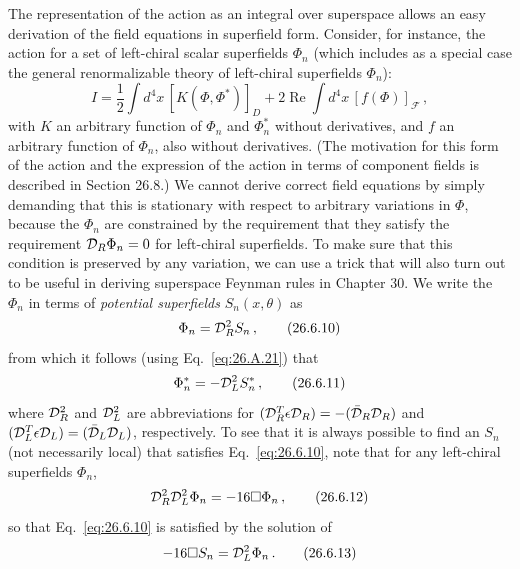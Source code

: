The representation of the action as an integral over superspace allows an
easy derivation of the field equations in superfield form. Consider, for
instance, the action for a set of left-chiral scalar superfields \(\Phi_n\)
(which includes as a special case the general renormalizable theory of
left-chiral superfields \(\Phi_n\)):
\begin{equation}
  I
  =\frac12\int d^4x\,[K(\Phi,\Phi^*)]_D
   +2\operatorname{Re}\int d^4x\,[f(\Phi)]_{\mathcal{F}}\,,
  \tag{26.6.9}\label{eq:26.6.9}
\end{equation}
with \(K\) an arbitrary function of \(\Phi_n\) and \(\Phi_n^*\) without
derivatives, and \(f\) an arbitrary function of \(\Phi_n\), also without
derivatives. (The motivation for this form of the action and the expression of
the action in terms of component fields is described in Section 26.8.) We
cannot derive correct field equations by simply demanding that this is
stationary with respect to arbitrary variations in \(\Phi\), because the
\(\Phi_n\) are constrained by the requirement that they satisfy the
requirement \(\mathcal{D}_R\Phi_n=0\) for left-chiral superfields. To make sure
that this condition is preserved by any variation, we can use a trick that
will also turn out to be useful in deriving superspace Feynman rules in
Chapter 30. We write the \(\Phi_n\) in terms of \emph{potential superfields}
\(S_n(x,\theta)\) as
\begin{equation}
  \Phi_n=\mathcal{D}_R^2S_n\,,
  \tag{26.6.10}\label{eq:26.6.10}
\end{equation}
from which it follows (using Eq.~\eqref{eq:26.A.21}) that
\begin{equation}
  \Phi_n^*=-\mathcal{D}_L^2S_n^*\,,
  \tag{26.6.11}\label{eq:26.6.11}
\end{equation}
where \(\mathcal{D}_R^2\) and \(\mathcal{D}_L^2\) are abbreviations for
\((\mathcal{D}_R^T\epsilon\mathcal{D}_R)=-(\bar{\mathcal{D}}_R\mathcal{D}_R)\) and
\((\mathcal{D}_L^T\epsilon\mathcal{D}_L)=(\bar{\mathcal{D}}_L\mathcal{D}_L)\), respectively.
To see that it is always possible to find an \(S_n\) (not necessarily local)
that satisfies Eq.~\eqref{eq:26.6.10}, note that for any left-chiral
superfields \(\Phi_n\),
\begin{equation}
  \mathcal{D}_R^2\mathcal{D}_L^2\Phi_n=-16\Box\Phi_n\,,
  \tag{26.6.12}\label{eq:26.6.12}
\end{equation}
so that Eq.~\eqref{eq:26.6.10} is satisfied by the solution of
\begin{equation}
  -16\Box S_n=\mathcal{D}_L^2\Phi_n\,.
  \tag{26.6.13}\label{eq:26.6.13}
\end{equation}

